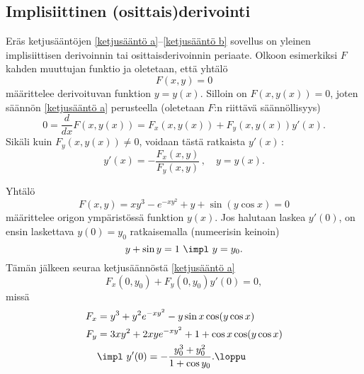 \subsection*{Implisiittinen (osittais)derivointi}

Eräs ketjusääntöjen \eqref{ketjusääntö a}--\eqref{ketjusääntö b} sovellus on yleinen 
implisiittisen derivoinnin tai osittaisderivoinnin periaate. Olkoon esimerkiksi $F$ kahden
muuttujan funktio ja oletetaan, että yhtälö
\[
F(x,y)=0
\]
määrittelee derivoituvan funktion $y=y(x)$. Silloin on $F(x,y(x))=0$, joten säännön 
\eqref{ketjusääntö a} perusteella (oletetaan $F$:n riittävä säännöllisyys)
\[
0 = \frac{d}{dx} F(x,y(x)) = F_x(x,y(x))+F_y(x,y(x))y'(x).
\]
Sikäli kuin $F_y(x,y(x))\neq 0$, voidaan tästä ratkaista $y'(x)\,$:
\[
y'(x)=-\frac{F_x(x,y)}{F_y(x,y)}\,, \quad y=y(x).
\]
\begin{Exa} Yhtälö
\[
F(x,y)=xy^3-e^{-xy^2}+y+\sin(y\cos x)=0
\]
määrittelee origon ympäristössä funktion $y(x)$. Jos halutaan laskea $y'(0)$, on ensin
laskettava $y(0)=y_0$ ratkaisemalla (numeerisin keinoin)
\[
y+\sin y=1 \ \impl \ y=y_0.
\]
Tämän jälkeen seuraa ketjusäännöstä \eqref{ketjusääntö a}
\[
F_x(0,y_0)+F_y(0,y_0)y'(0)=0,
\]
missä
\begin{align*}
F_x &= y^3+y^2e^{-xy^2}-y\sin x\cos (y\cos x) \\
F_y &= 3xy^2+2xye^{-xy^2}+1+\cos x\cos (y\cos x) \\
&\impl \ y'(0)=-\frac{y_0^3+y_0^2}{1+\cos y_0}. \loppu
\end{align*}
\end{Exa}

